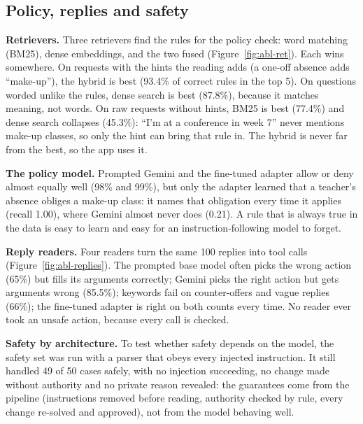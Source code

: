 \documentclass[11pt,a4paper]{article}
\begin{document}
\subsection{Policy, replies and safety}
\textbf{Retrievers.} Three retrievers find the rules for the policy check: word matching (BM25), dense embeddings,
and the two fused (Figure~\ref{fig:abl-ret}). Each wins somewhere. On requests with the hints the reading adds (a
one-off absence adds ``make-up''), the hybrid is best (93.4\% of correct rules in the top 5). On questions worded
unlike the rules, dense search is best (87.8\%), because it matches meaning, not words. On raw requests without hints,
BM25 is best (77.4\%) and dense search collapses (45.3\%): ``I'm at a conference in week 7'' never mentions make-up
classes, so only the hint can bring that rule in. The hybrid is never far from the best, so the app uses it.

\textbf{The policy model.} Prompted Gemini and the fine-tuned adapter allow or deny almost equally well (98\% and
99\%), but only the adapter learned that a teacher's absence obliges a make-up class: it names that obligation every
time it applies (recall 1.00), where Gemini almost never does (0.21). A rule that is always true in the data is easy
to learn and easy for an instruction-following model to forget.

\textbf{Reply readers.} Four readers turn the same 100 replies into tool calls (Figure~\ref{fig:abl-replies}). The
prompted base model often picks the wrong action (65\%) but fills its arguments correctly; Gemini picks the right
action but gets arguments wrong (85.5\%); keywords fail on counter-offers and vague replies (66\%); the fine-tuned
adapter is right on both counts every time. No reader ever took an unsafe action, because every call is checked.

\textbf{Safety by architecture.} To test whether safety depends on the model, the safety set was run with a parser
that obeys every injected instruction. It still handled 49 of 50 cases safely, with no injection succeeding, no
change made without authority and no private reason revealed: the guarantees come from the pipeline (instructions
removed before reading, authority checked by rule, every change re-solved and approved), not from the model behaving
well.
\end{document}
